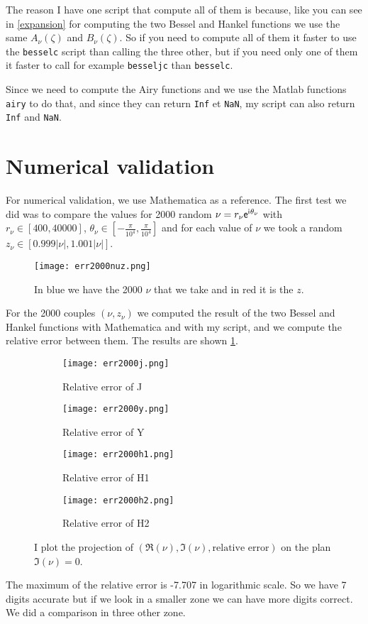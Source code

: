\documentclass[12pt,a4paper]{article}
\numberwithin{equation}{section}
\newcommand{\ex}{\mathsf{e}}
\newcommand{\im}{\mathsf{i}\mkern1mu}
\theoremstyle{definition}
\theoremstyle{plain}
\theoremstyle{remark}
\begin{document}
The reason I have one script that compute all of them is because, like you can see in \cref{expansion} for computing the two Bessel and Hankel functions we use the same \( A_\nu(\zeta) \) and \( B_\nu(\zeta) \).
So if you need to compute all of them it faster to use the \texttt{besselc} script than calling the three other, but if you need only one of them it faster to call for example \texttt{besseljc} than \texttt{besselc}.

Since we need to compute the Airy functions and we use the Matlab functions \texttt{airy} to do that, and since they can return \texttt{Inf} et \texttt{NaN}, my script can also return \texttt{Inf} and \texttt{NaN}.

\section{Numerical validation}

For numerical validation, we use Mathematica as a reference.
The first test we did was to compare the values for 2000 random \( \nu = r_\nu \ex^{\im \theta_\nu} \) with \( r_\nu \in [400,40000] \), \( \theta_\nu \in \left[-\frac{\pi}{10^4},\frac{\pi}{10^4}\right] \) and for each value of \( \nu \) we took a random \( z_\nu \in [0.999 |\nu|, 1.001 |\nu|] \).
\begin{figure}[h]
    \centering
    \texttt{[image: err2000nuz.png]}
    \caption{In blue we have the 2000 \( \nu \) that we take and in red it is the \( z \).}
\end{figure}
For the 2000 couples \( (\nu,z_\nu) \) we computed the result of the two Bessel and Hankel functions with Mathematica and with my script, and we compute the relative error between them.
The results are shown \cref{err2000}.
\begin{figure}[ht]
    \centering
    \begin{subfigure}[h]{0.45\textwidth}
        \texttt{[image: err2000j.png]}
        \caption{Relative error of J}
    \end{subfigure}
    \begin{subfigure}[h]{0.45\textwidth}
        \texttt{[image: err2000y.png]}
        \caption{Relative error of Y}
    \end{subfigure}

    \begin{subfigure}[h]{0.45\textwidth}
        \texttt{[image: err2000h1.png]}
        \caption{Relative error of H1}
    \end{subfigure}
    \begin{subfigure}[h]{0.45\textwidth}
        \texttt{[image: err2000h2.png]}
        \caption{Relative error of H2}
    \end{subfigure}
    \caption{I plot the projection of \( (\Re(\nu),\Im(\nu),\text{relative error}) \) on the plan \( \Im(\nu)=0 \).}
    \label{err2000}
\end{figure}
The maximum of the relative error is -7.707 in logarithmic scale. So we have 7 digits accurate but if we look in a smaller zone we can have more digits correct.
We did a comparison in three other zone.
\end{document}
